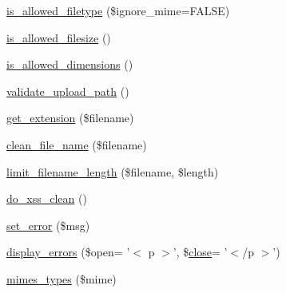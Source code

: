 \begin{DoxyCompactItemize}
\item 
\hyperlink{class_c_i___upload_a248e8cef69fc954953dc988e8d82afca}{is\-\_\-allowed\-\_\-filetype} (\$ignore\-\_\-mime=F\-A\-L\-S\-E)
\item 
\hyperlink{class_c_i___upload_aa1283241c3b2fc700c7b577beecd5f97}{is\-\_\-allowed\-\_\-filesize} ()
\item 
\hyperlink{class_c_i___upload_a70d66ccc85ab4ec9e76e02cfeaccc193}{is\-\_\-allowed\-\_\-dimensions} ()
\item 
\hyperlink{class_c_i___upload_a067f092935018f0d1fbfa955ddecfee3}{validate\-\_\-upload\-\_\-path} ()
\item 
\hyperlink{class_c_i___upload_a6c656eedccb1131accc8e350bc50632f}{get\-\_\-extension} (\$filename)
\item 
\hyperlink{class_c_i___upload_ae243476bbecc4448f38fb52d7a883c32}{clean\-\_\-file\-\_\-name} (\$filename)
\item 
\hyperlink{class_c_i___upload_ab1f627192a69c4b88a44ad60ba05d0af}{limit\-\_\-filename\-\_\-length} (\$filename, \$length)
\item 
\hyperlink{class_c_i___upload_ae7e5f9b6d774795da126647f10c3c2a6}{do\-\_\-xss\-\_\-clean} ()
\item 
\hyperlink{class_c_i___upload_a892f1ba7cba3731a3fc68f1f64e92610}{set\-\_\-error} (\$msg)
\item 
\hyperlink{class_c_i___upload_a3ed4aa1a4d480c82bb1b663efd466aee}{display\-\_\-errors} (\$open= '$<$ p $>$', \$\hyperlink{bootstrap_8min_8js_ac581e13fc2b7b6ddfcf10b44940becde}{close}= '$<$/p $>$')
\item 
\hyperlink{class_c_i___upload_aa72da887bec3d5e3fe922c402f706209}{mimes\-\_\-types} (\$mime)
\end{DoxyCompactItemize}
